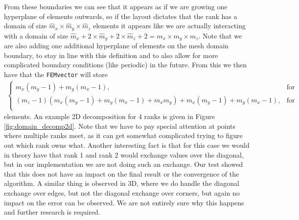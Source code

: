 From these boundaries we can see that it appears as if we are growing one hyperplane of elements outwards, so if the layout dictates that the rank has a domain of size $\hat{m}_x \times \hat{m}_y \times \hat{m}_z$ elements it appears like we are actually interacting with a domain of size $\hat{m}_x + 2 \times \hat{m}_y + 2 \times \hat{m}_z + 2 = m_x \times m_y \times m_z$. Note that we are also adding one additional hyperplane of elements on the mesh domain boundary, to stay in line with this definition and to also allow for more complicated boundary conditions (like periodic) in the future. From this we then have that the \texttt{FEMvector} will store
\begin{align}
    \begin{cases}
    m_x(m_y-1) + m_y(m_x-1), &\text{for 2D} \\
    (m_z-1)(m_x(m_y-1) + m_y(m_x-1) + m_xm_y) + m_x(m_y-1) + m_y(m_x-1), &\text{for 3D}\\
    \end{cases}
\end{align}
elements. An example 2D decomposition for 4 ranks is given in Figure \ref{fig:domain_decomp2d}. Note that we have to pay special attention at points where multiple ranks meet, as it can get somewhat complicated trying to figure out which rank owns what. Another interesting fact is that for this case we would in theory have that rank 1 and rank 2 would exchange values over the diagonal, but in our implementation we are not doing such an exchange. Our test showed that this does not have an impact on the final result or the convergence of the algorithm. A similar thing is observed in 3D, where we do handle the diagonal exchange over edges, but not the diagonal exchange over corners, but again no impact on the error can be observed. We are not entirely sure why this happens and further research is required.\medskip

